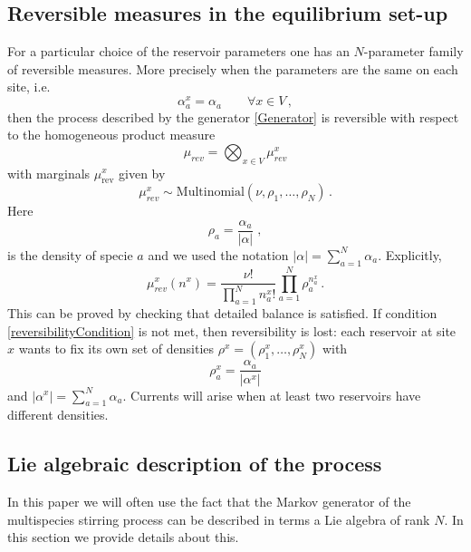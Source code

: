 \documentclass[10pt]{article}
\numberwithin{equation}{section}
\numberwithin{equation}{subsection}
\newcommand{\co}{\;,}
\newcommand{\twoj}{\nu}
\begin{document}
\subsection{Reversible measures in the equilibrium set-up}
For a particular choice of the reservoir parameters one has an $N$-parameter family of reversible measures. More precisely
when the parameters are the same on each site, i.e.
\begin{equation}\label{reversibilityCondition}
\alpha_{a}^{x}=\alpha_{a}\qquad \forall x\in V\,,
\end{equation}
then the process described by the generator \eqref{Generator} is reversible with respect to the 
homogeneous product measure 
\begin{equation}
\label{reversibleMeasure}
\mu_{rev}=\bigotimes_{x\in V}\mu_{rev}^{x}
\end{equation}
with marginals $\mu_{\text{rev}}^{x}$ given by 
\begin{equation}
 \mu^{x}_{rev}\sim \text{Multinomial}\left(\twoj,\rho_{1},\ldots,\rho_{N}\right)\,.
\end{equation}
Here
 $$
\rho_{a}=\frac{\alpha_{a}}{|\alpha|}\co
$$
is the density of specie $a$ and we used the notation $|\alpha|=\sum_{a=1}^{N}\alpha_{a}$. Explicitly, 
\begin{equation}
\mu_{rev}^{x}(n^{x})=\frac{\nu!}{\prod_{a=1}^{N}n_{a}^{x}!}\prod_{a=1}^{N}\rho_{a}^{n_{a}^{x}}\,.
\end{equation}
This can be proved  by checking that detailed balance is satisfied. 
If condition \eqref{reversibilityCondition} is not met, then reversibility is lost: each reservoir at site $x$ wants to fix its own set of densities $\rho^{x}=(\rho_{1}^{x},\ldots,\rho_{N}^{x})$ with
\begin{equation}
\label{rhox}
\rho_{a}^x=\frac{\alpha_{a}}{|\alpha^x|}
\end{equation}
and  $|\alpha^x|=\sum_{a=1}^{N}\alpha_{a}$. 
Currents will arise when at least two reservoirs have different densities. 

\subsection{Lie algebraic description of the process}

In this paper we will often use the fact that the Markov generator of the multispecies stirring process can be described in terms a Lie algebra of rank $N$.
In this section we provide details about this.
\end{document}
